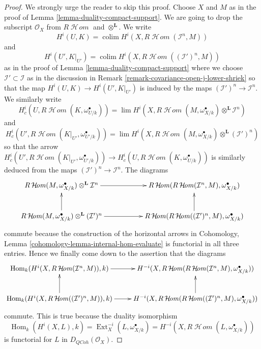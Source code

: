 \documentclass[10pt,a4paper]{amsart}
\theoremstyle{plain}
\theoremstyle{definition}
\theoremstyle{remark}
\numberwithin{equation}{subsection}
\def\lim{\mathop{\mathrm{lim}}\nolimits}
\def\colim{\mathop{\mathrm{colim}}\nolimits}
\def\Hom{\mathop{\mathrm{Hom}}\nolimits}
\def\Ext{\mathop{\mathrm{Ext}}\nolimits}
\def\SheafHom{\mathop{\mathcal{H}\!\mathit{om}}\nolimits}
\def\QCoh{\mathit{QCoh}}
\begin{document}
\begin{proof}
We strongly urge the reader to skip this proof. Choose $X$ and $M$ as
in the proof of Lemma \ref{lemma-duality-compact-support}. We are going to drop
the subscript $\mathcal{O}_X$ from $R\SheafHom$ and $\otimes^\mathbf{L}$.
We write
$$
H^i(U, K) = \colim H^i(X, R\SheafHom(\mathcal{I}^n, M))
$$
and
$$
H^i(U', K|_{U'}) = \colim H^i(X, R\SheafHom((\mathcal{I}')^n, M))
$$
as in the proof of Lemma \ref{lemma-duality-compact-support} where we choose
$\mathcal{I}' \subset \mathcal{I}$ as in the discussion in
Remark \ref{remark-covariance-open-j-lower-shriek} so that the map
$H^i(U, K) \to H^i(U', K|_{U'})$ is induced by the maps
$(\mathcal{I}')^n \to \mathcal{I}^n$.
We similarly write
$$
H^i_c(U, R\SheafHom(K, \omega_{U/k}^\bullet)) =
\lim H^i(X,  R\SheafHom(M, \omega_{X/k}^\bullet)
\otimes^\mathbf{L} \mathcal{I}^n)
$$
and
$$
H^i_c(U', R\SheafHom(K|_{U'}, \omega_{U'/k}^\bullet)) =
\lim H^i(X,  R\SheafHom(M, \omega_{X/k}^\bullet)
\otimes^\mathbf{L} (\mathcal{I}')^n)
$$
so that the arrow $H^i_c(U', R\SheafHom(K|_{U'}, \omega_{U'/k}^\bullet))
\to H^i_c(U, R\SheafHom(K, \omega_{U/k}^\bullet))$ is similarly
deduced from the maps $(\mathcal{I}')^n \to \mathcal{I}^n$.
The diagrams
$$
\xymatrix{
R\SheafHom(M, \omega_{X/k}^\bullet)
\otimes^\mathbf{L} \mathcal{I}^n
\ar[rr] & &
R\SheafHom(R\SheafHom(\mathcal{I}^n, M), \omega_{X/k}^\bullet) \\
R\SheafHom(M, \omega_{X/k}^\bullet) \otimes^\mathbf{L} (\mathcal{I}')^n
\ar[rr] \ar[u] & &
R\SheafHom(R\SheafHom((\mathcal{I}')^n, M), \omega_{X/k}^\bullet) \ar[u]
}
$$
commute because the construction of the horizontal arrows in
Cohomology, Lemma \ref{cohomology-lemma-internal-hom-evaluate}
is functorial in all three entries. Hence we finally come down
to the assertion that the diagrams
$$
\xymatrix{
\Hom_k(H^i(X, R\SheafHom(\mathcal{I}^n, M)), k) \ar[r] &
H^{-i}(X, R\SheafHom(R\SheafHom(
\mathcal{I}^n, M), \omega_{X/k}^\bullet)) \\
\Hom_k(H^i(X, R\SheafHom((\mathcal{I}')^n, M)), k) \ar[r] \ar[u] &
H^{-i}(X, R\SheafHom(R\SheafHom(
(\mathcal{I}')^n, M), \omega_{X/k}^\bullet)) \ar[u]
}
$$
commute. This is true because the duality isomorphism
$$
\Hom_k(H^i(X, L), k) = \Ext^{-i}_X(L, \omega_{X/k}^\bullet) =
H^{-i}(X, R\SheafHom(L, \omega_{X/k}^\bullet))
$$
is functorial for $L$ in $D_\QCoh(\mathcal{O}_X)$.
\end{proof}
\end{document}
